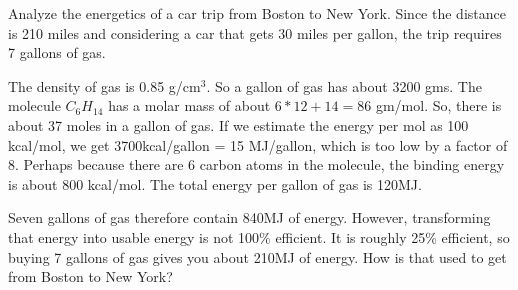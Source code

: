 \documentclass[11pt]{book}
\begin{document}


Analyze the energetics of a car trip from Boston to New York. Since the distance is 210 miles and considering a car that gets 30 miles per gallon, the trip requires 7 gallons of gas. 


The density of gas is  0.85 g/cm$^3$. So a gallon of gas has about 3200 gms. The molecule $C_6H_{14}$ has a molar mass of about $6*12+14=86$ gm/mol. So, there is about 37 moles in a gallon of gas. If we estimate the energy per mol as 100 kcal/mol, we get 3700kcal/gallon = 15 MJ/gallon, which is too low by a factor of 8. Perhaps because there are 6 carbon atoms in the molecule, the binding energy is about 800 kcal/mol. The total energy per gallon of gas is 120MJ.

Seven gallons of gas therefore contain 840MJ of energy. However, transforming that energy into usable energy is not 100\% efficient. It is roughly 25\% efficient, so buying 7 gallons of gas gives you about 210MJ of energy. How is that used to get from Boston to New York?
\end{document}
